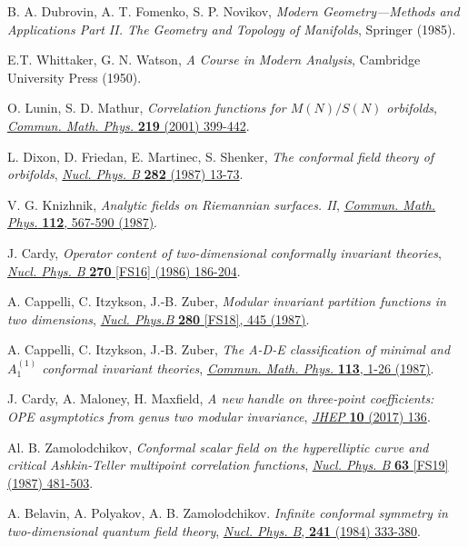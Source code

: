 \documentclass[a4paper,11pt]{article}
\begin{document}
\begin{thebibliography}{99}

 B. A. Dubrovin, A. T. Fomenko, S. P. Novikov, \textit{Modern Geometry---Methods and Applications Part II. The Geometry and Topology of Manifolds}, Springer (1985).

 E.T. Whittaker, G. N. Watson, \emph{A Course in Modern Analysis}, Cambridge University Press (1950).

 O. Lunin, S. D. Mathur, \emph{Correlation functions for $M(N)/S(N)$ orbifolds}, \href{https://doi.org/10.1007/s002200100431}{\emph{Commun. Math. Phys.} {\bf 219} (2001) 399-442}.

 L. Dixon, D. Friedan, E. Martinec, S. Shenker, \textit{The conformal field theory of orbifolds}, 
\href{https://doi.org/10.1016/0550-3213(87)90676-6}{\emph{Nucl. Phys. B} {\bf 282} (1987) 13-73}.

 V. G. Knizhnik, \emph{Analytic fields on Riemannian surfaces. II}, 
\href{https://doi.org/10.1007/BF01225373}{\emph{Commun. Math. Phys.} {\bf 112}, 567-590 (1987)}.

 J. Cardy, \emph{Operator content of two-dimensional conformally invariant theories}, 
\href{https://doi.org/10.1016/0550-3213(86)90552-3}{\emph{Nucl. Phys. B} {\bf 270} [FS16] (1986) 186-204}.

 A. Cappelli, C. Itzykson, J.-B. Zuber, \emph{Modular invariant partition functions in two dimensions}, 
\href{https://doi.org/10.1016/0550-3213(87)90155-6}{\emph{Nucl. Phys.B} {\bf 280} [FS18], 445 (1987)}.

 A. Cappelli, C. Itzykson, J.-B. Zuber, \emph{The A-D-E classification of minimal and $A_1^{(1)}$ conformal invariant theories}, \href{https://doi.org/10.1007/BF01221394}{\emph{Commun. Math. Phys.} {\bf 113}, 1-26 (1987)}.

 J. Cardy, A. Maloney, H. Maxfield, \emph{A new handle on three-point coefficients: OPE asymptotics from genus
two modular invariance}, \href{https://doi.org/10.1007/JHEP10(2017)136}{\emph{JHEP} {\bf 10} (2017) 136}.

 Al. B. Zamolodchikov, \emph{Conformal scalar field on the hyperelliptic curve and critical Ashkin-Teller multipoint correlation functions}, \href{https://doi.org/10.1016/0550-3213(87)90350-6}{\emph{Nucl. Phys. B} {\bf 63} [FS19] (1987) 481-503}.

 A. Belavin, A. Polyakov, A. B. Zamolodchikov. \emph{Infinite conformal symmetry in two-dimensional quantum field theory},
\href{https://doi.org/10.1016/0550-3213(84)90052-X}{\emph{Nucl. Phys. B}, {\bf 241} (1984) 333-380}.


\end{thebibliography}
\end{document}
